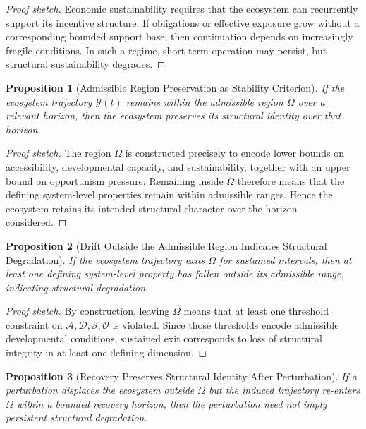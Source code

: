 \documentclass[11pt]{article}
\newtheorem{proposition}{Proposition}
\begin{document}
\begin{proof}[Proof sketch]
Economic sustainability requires that the ecosystem can recurrently support its incentive structure. If obligations or effective exposure grow without a corresponding bounded support base, then continuation depends on increasingly fragile conditions. In such a regime, short-term operation may persist, but structural sustainability degrades.
\end{proof}

\begin{proposition}[Admissible Region Preservation as Stability Criterion]
If the ecosystem trajectory \(\mathcal{Y}(t)\) remains within the admissible region \(\Omega\) over a relevant horizon, then the ecosystem preserves its structural identity over that horizon.
\end{proposition}

\begin{proof}[Proof sketch]
The region \(\Omega\) is constructed precisely to encode lower bounds on accessibility, developmental capacity, and sustainability, together with an upper bound on opportunism pressure. Remaining inside \(\Omega\) therefore means that the defining system-level properties remain within admissible ranges. Hence the ecosystem retains its intended structural character over the horizon considered.
\end{proof}

\begin{proposition}[Drift Outside the Admissible Region Indicates Structural Degradation]
If the ecosystem trajectory exits \(\Omega\) for sustained intervals, then at least one defining system-level property has fallen outside its admissible range, indicating structural degradation.
\end{proposition}

\begin{proof}[Proof sketch]
By construction, leaving \(\Omega\) means that at least one threshold constraint on \(\mathcal{A}, \mathcal{D}, \mathcal{S}, \mathcal{O}\) is violated. Since those thresholds encode admissible developmental conditions, sustained exit corresponds to loss of structural integrity in at least one defining dimension.
\end{proof}

\begin{proposition}[Recovery Preserves Structural Identity After Perturbation]
If a perturbation displaces the ecosystem outside \(\Omega\) but the induced trajectory re-enters \(\Omega\) within a bounded recovery horizon, then the perturbation need not imply persistent structural degradation.
\end{proposition}
\end{document}
